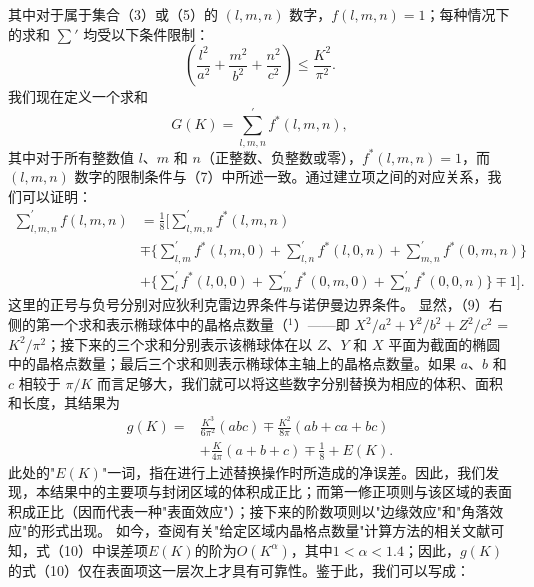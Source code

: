 其中对于属于集合（3）或（5）的 \((l,m,n)\) 数字，\(f(l,m,n)=1\)；每种情况下的求和 \(\sum'\) 均受以下条件限制：
\begin{equation}\tag{17.1.7}\label{eq:17.1.7}
\left( \frac { l ^{2} } { a ^{2} } + \frac { m ^{2} } { b ^{2} } + \frac { n ^{2} } { c ^{2} } \right) \leq \frac { K ^{2} } { \pi ^{2} } .
\end{equation}
我们现在定义一个求和
\begin{equation}\tag{17.1.8}\label{eq:17.1.8}
G ( K ) = \sum _ { l , m , n } ^{\prime} f ^{*} ( l , m , n ) ,
\end{equation}
其中对于所有整数值 \(l\)、\(m\) 和 \(n\)（正整数、负整数或零），\(f^{*}(l,m,n)=1\)，而 \((l,m,n)\) 数字的限制条件与（7）中所述一致。通过建立项之间的对应关系，我们可以证明：
\begin{equation}\tag{17.1.9}\label{eq:17.1.9}
\begin{aligned}
\sum_{l,m,n}^{\prime} f(l,m,n)
&= \frac{1}{8}\Bigg[
\sum_{l,m,n}^{\prime} f^{*}(l,m,n) \\
&\mp \Big\{
\sum_{l,m}^{\prime} f^{*}(l,m,0)
+ \sum_{l,n}^{\prime} f^{*}(l,0,n)
+ \sum_{m,n}^{\prime} f^{*}(0,m,n)
\Big\} \\
&+ \Big\{
\sum_{l}^{\prime} f^{*}(l,0,0)
+ \sum_{m}^{\prime} f^{*}(0,m,0)
+ \sum_{n}^{\prime} f^{*}(0,0,n)
\Big\}
\mp 1
\Bigg].
\end{aligned}
\end{equation}
这里的正号与负号分别对应狄利克雷边界条件与诺伊曼边界条件。
显然，（9）右侧的第一个求和表示椭球体中的晶格点数量（\(^{1}\)）——即 \(X^{2}/a^{2}+Y^{2}/b^{2}+Z^{2}/c^{2}\) = \(K^{2}/\pi^{2}\)；接下来的三个求和分别表示该椭球体在以 \(Z\)、\(Y\) 和 \(X\) 平面为截面的椭圆中的晶格点数量；最后三个求和则表示椭球体主轴上的晶格点数量。如果 \(a\)、\(b\) 和 \(c\) 相较于 \(\pi/K\) 而言足够大，我们就可以将这些数字分别替换为相应的体积、面积和长度，其结果为
\begin{equation}\tag{17.1.10}\label{eq:17.1.10}
\begin{aligned}
g(K)={}&\frac{K^3}{6\pi^2}(abc)
\mp \frac{K^2}{8\pi}(ab+ca+bc) \\
&+ \frac{K}{4\pi}(a+b+c)
\mp \frac{1}{8}
+ E(K).
\end{aligned}
\end{equation}
此处的"\(E(K)\)"一词，指在进行上述替换操作时所造成的净误差。因此，我们发现，本结果中的主要项与封闭区域的体积成正比；而第一修正项则与该区域的表面积成正比（因而代表一种"表面效应"）；接下来的阶数项则以"边缘效应"和"角落效应"的形式出现。
如今，查阅有关"给定区域内晶格点数量"计算方法的相关文献可知，式（10）中误差项\(E(K)\)的阶为\(O(K^{\alpha})\)，其中\(1 < \alpha < 1.4\)；因此，\(g(K)\)的式（10）仅在表面项这一层次上才具有可靠性。鉴于此，我们可以写成：
